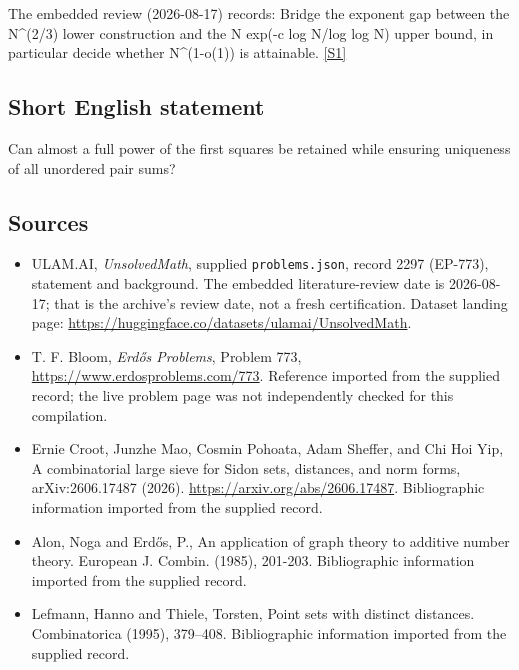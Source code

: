 \documentclass[11pt,a4paper]{article}
\newcommand{\sref}[2]{\hyperlink{source:#1:#2}{[S#2]}}
\begin{document}
The embedded review (2026-08-17) records: Bridge the exponent gap between the N\textasciicircum{}(2/3) lower construction and the N exp(-c log N/log log N) upper bound, in particular decide whether N\textasciicircum{}(1-o(1)) is attainable. \sref{2297}{1}

\subsection{Short English statement}

Can almost a full power of the first squares be retained while ensuring uniqueness of all unordered pair sums?

\subsection{Sources}

{\small

\begin{itemize}

\item[\hypertarget{source:2297:1}{S1}] ULAM.AI, \emph{UnsolvedMath}, supplied \texttt{problems.json}, record 2297 (EP-773), statement and background. The embedded literature-review date is 2026-08-17; that is the archive’s review date, not a fresh certification. Dataset landing page: \url{https://huggingface.co/datasets/ulamai/UnsolvedMath}.

\item[\hypertarget{source:2297:2}{S2}] T. F. Bloom, \emph{Erdős Problems}, Problem 773, \url{https://www.erdosproblems.com/773}. Reference imported from the supplied record; the live problem page was not independently checked for this compilation.

\item[\hypertarget{source:2297:3}{S3}] Ernie Croot, Junzhe Mao, Cosmin Pohoata, Adam Sheffer, and Chi Hoi Yip, A combinatorial large sieve for Sidon sets, distances, and norm forms, arXiv:2606.17487 (2026). \url{https://arxiv.org/abs/2606.17487}. Bibliographic information imported from the supplied record.

\item[\hypertarget{source:2297:4}{S4}] Alon, Noga and Erd\H{o}s, P., An application of graph theory to additive number theory. European J. Combin. (1985), 201-203. Bibliographic information imported from the supplied record.

\item[\hypertarget{source:2297:5}{S5}] Lefmann, Hanno and Thiele, Torsten, Point sets with distinct distances. Combinatorica (1995), 379--408. Bibliographic information imported from the supplied record.

\end{itemize}

}

\label{end:2297}
\end{document}
